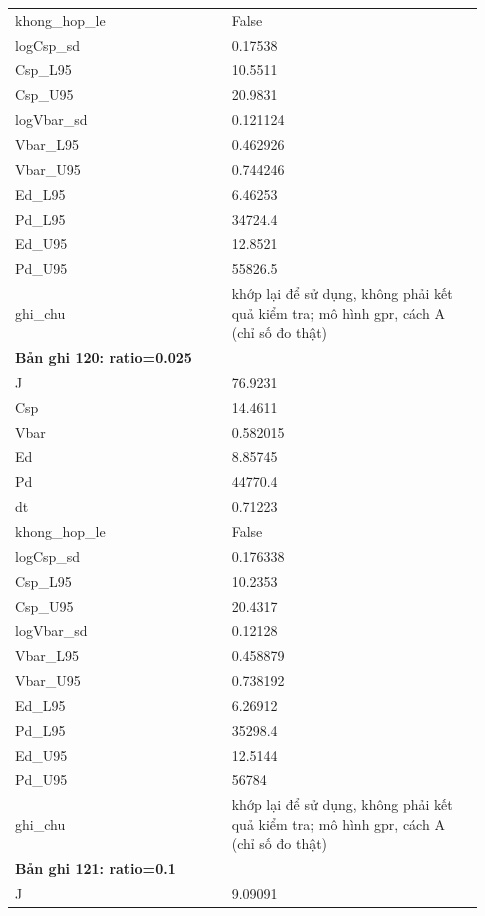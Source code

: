 \begin{longtable}{p{0.43\linewidth}p{0.50\linewidth}}
khong\_\allowbreak hop\_\allowbreak le & False \\
logCsp\_\allowbreak sd & 0.17538 \\
Csp\_\allowbreak L95 & 10.5511 \\
Csp\_\allowbreak U95 & 20.9831 \\
logVbar\_\allowbreak sd & 0.121124 \\
Vbar\_\allowbreak L95 & 0.462926 \\
Vbar\_\allowbreak U95 & 0.744246 \\
Ed\_\allowbreak L95 & 6.46253 \\
Pd\_\allowbreak L95 & 34724.4 \\
Ed\_\allowbreak U95 & 12.8521 \\
Pd\_\allowbreak U95 & 55826.5 \\
ghi\_\allowbreak chu & khớp lại để sử dụng, không phải kết quả kiểm tra; mô hình gpr, cách A (chỉ số đo thật) \\
\midrule
\multicolumn{2}{p{0.95\linewidth}}{\textbf{Bản ghi 120: ratio=0.025}} \\
J & 76.9231 \\
Csp & 14.4611 \\
Vbar & 0.582015 \\
Ed & 8.85745 \\
Pd & 44770.4 \\
dt & 0.71223 \\
khong\_\allowbreak hop\_\allowbreak le & False \\
logCsp\_\allowbreak sd & 0.176338 \\
Csp\_\allowbreak L95 & 10.2353 \\
Csp\_\allowbreak U95 & 20.4317 \\
logVbar\_\allowbreak sd & 0.12128 \\
Vbar\_\allowbreak L95 & 0.458879 \\
Vbar\_\allowbreak U95 & 0.738192 \\
Ed\_\allowbreak L95 & 6.26912 \\
Pd\_\allowbreak L95 & 35298.4 \\
Ed\_\allowbreak U95 & 12.5144 \\
Pd\_\allowbreak U95 & 56784 \\
ghi\_\allowbreak chu & khớp lại để sử dụng, không phải kết quả kiểm tra; mô hình gpr, cách A (chỉ số đo thật) \\
\midrule
\multicolumn{2}{p{0.95\linewidth}}{\textbf{Bản ghi 121: ratio=0.1}} \\
J & 9.09091 \\

\end{longtable}
